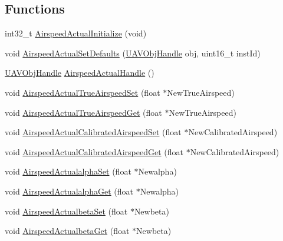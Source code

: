 \subsection*{\-Functions}
\begin{DoxyCompactItemize}
\item 
int32\-\_\-t \hyperlink{group___airspeed_actual_ga877ee44a8b6822ec3f669265175f466f}{\-Airspeed\-Actual\-Initialize} (void)
\item 
void \hyperlink{group___airspeed_actual_ga3a0be7509a3351dcfcb9012775123529}{\-Airspeed\-Actual\-Set\-Defaults} (\hyperlink{targets_2_u_a_v_objects_2inc_2uavobjectmanager_8h_a279053e22be53ce9f895043aaeb91e3b}{\-U\-A\-V\-Obj\-Handle} obj, uint16\-\_\-t inst\-Id)
\item 
\hyperlink{targets_2_u_a_v_objects_2inc_2uavobjectmanager_8h_a279053e22be53ce9f895043aaeb91e3b}{\-U\-A\-V\-Obj\-Handle} \hyperlink{group___airspeed_actual_ga2f2095325111cfe3234a25774907afbc}{\-Airspeed\-Actual\-Handle} ()
\item 
void \hyperlink{group___airspeed_actual_ga77c50b37e96e75c05c65296b6a4ddfab}{\-Airspeed\-Actual\-True\-Airspeed\-Set} (float $\ast$\-New\-True\-Airspeed)
\item 
void \hyperlink{group___airspeed_actual_ga3dc584816b1d9ba0736288b831f1356b}{\-Airspeed\-Actual\-True\-Airspeed\-Get} (float $\ast$\-New\-True\-Airspeed)
\item 
void \hyperlink{group___airspeed_actual_ga1066630dfa454797c13eb8613efa6a0a}{\-Airspeed\-Actual\-Calibrated\-Airspeed\-Set} (float $\ast$\-New\-Calibrated\-Airspeed)
\item 
void \hyperlink{group___airspeed_actual_ga7b90efb2d29c7e51145df19dc19f4a38}{\-Airspeed\-Actual\-Calibrated\-Airspeed\-Get} (float $\ast$\-New\-Calibrated\-Airspeed)
\item 
void \hyperlink{group___airspeed_actual_ga06f3cdf1abe6eae469880f8266080fa0}{\-Airspeed\-Actualalpha\-Set} (float $\ast$\-Newalpha)
\item 
void \hyperlink{group___airspeed_actual_ga3f85b2d9a7c32132c4c24475998dbec1}{\-Airspeed\-Actualalpha\-Get} (float $\ast$\-Newalpha)
\item 
void \hyperlink{group___airspeed_actual_ga5a2d0bc726ce54b9f65c507bced03cf2}{\-Airspeed\-Actualbeta\-Set} (float $\ast$\-Newbeta)
\item 
void \hyperlink{group___airspeed_actual_gad2f829b804963e58d2c51df12c7de389}{\-Airspeed\-Actualbeta\-Get} (float $\ast$\-Newbeta)
\end{DoxyCompactItemize}


